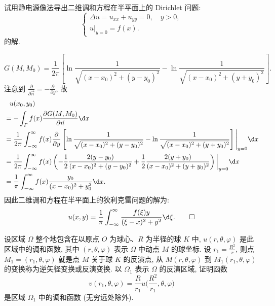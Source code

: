 \begin{exercise}
  试用静电源像法导出二维调和方程在半平面上的 Dirichlet 问题:
  \[\begin{cases}
    \Delta u = u_{xx} + u_{yy} = 0, \quad y>0, \\
    u|_{y=0} = f(x).
  \end{cases}\]
  的解.
\end{exercise}

\begin{solve}
  \[ G(M,M_0) = \frac{1}{2\pi} \left[\ln\frac{1}{\sqrt{(x-x_0)^2+(y-y_0)^2}}
      - \ln\frac{1}{\sqrt{(x-x_0)^2+(y+y_0)^2}}\right]. \]
  注意到 $\frac{\partial}{\partial\vec{n}} = - \frac{\partial}{\partial y}$, 故
  \begin{align*}
  & \phantom{=} u(x_0,y_0) \\
  & = -\int_{\varGamma}f(x) \frac{\partial G(M,M_0)}{\partial\vec{n}} \d x \\
  & = \frac{1}{2\pi} \int_{-\infty}^{\infty}f(x) \frac{\partial}{\partial y}
      \left[\ln\frac{1}{\sqrt{(x-x_0)^2+(y-y_0)^2}}-\ln\frac{1}{\sqrt{(x-x_0)^2+(y+y_0)^2}}\right]
      \Bigg|_{y=0} \d x \\
  & = \frac{1}{2\pi} \int_{-\infty}^{\infty} f(x)
      \left(-\frac{1}{2} \frac{2(y-y_0)}{(x-x_0)^2+(y-y_0)^2}
        + \frac{1}{2} \frac{2(y+y_0)}{(x-x_0)^2+(y+y_0)^2}\right)\bigg|_{y=0} \d x \\
  & = \frac{1}{\pi}\int_{-\infty}^{\infty}f(x)\frac{y_0}{(x-x_0)^2+y_0^2} \d x.
  \end{align*}
  因此二维调和方程在半平面上的狄利克雷问题的解为:
  \[u(x,y)=\frac{1}{\pi}\int_{-\infty}^{\infty}\frac{f(\xi)y}{(\xi-x)^2+y^2}\d\xi. \qedhere\]
\end{solve}


\begin{exercise}
  设区域 $\varOmega$ 整个地包含在以原点 $O$ 为球心、$R$ 为半径的球 $K$ 中,
  $u(r,\theta,\varphi)$ 是此区域中的调和函数, 其中 $(r,\theta,\varphi)$
  表示 $\varOmega$ 中动点 $M$ 的球坐标. 设 $r_1=\frac{R^2}{r}$, 则点
  $M_1=(r_1,\theta,\varphi)$ 就是点 $M$ 关于球 $K$ 的反演点, 从 $M(r,\theta,\varphi)$
  到 $M_1(r_1,\theta,\varphi)$ 的变换称为逆矢径变换或反演变换. 以 $\varOmega_1$
  表示 $\varOmega$ 的反演区域, 证明函数
  \[ v(r_1,\theta,\varphi) = \frac{R}{r_1} u\biggl(\frac{R^2}{r_1},\theta,\varphi\biggr)\]
  是区域 $\varOmega_1$ 中的调和函数 (无穷远处除外).
\end{exercise}

